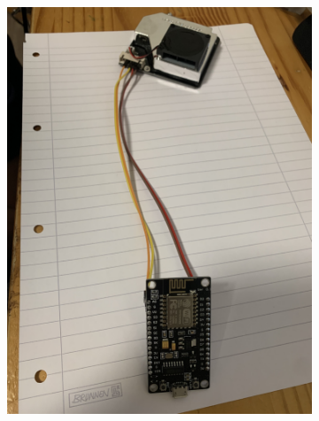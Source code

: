 \documentclass[draft=false
              ,paper=a4
              ,twoside=false
              ,fontsize=10pt
              ,headsepline
              ,BCOR10mm
              ,DIV11
              ]{article}
\begin{document}
\begin{figure}[h!]
  \centering
  \begin{subfigure}[b]{0.6\linewidth}
    \includegraphics[width=\linewidth, angle=90]{test_day_1}
  \end{subfigure}
  \begin{subfigure}[b]{0.38\linewidth}

\end{subfigure}
\end{figure}
\end{document}
